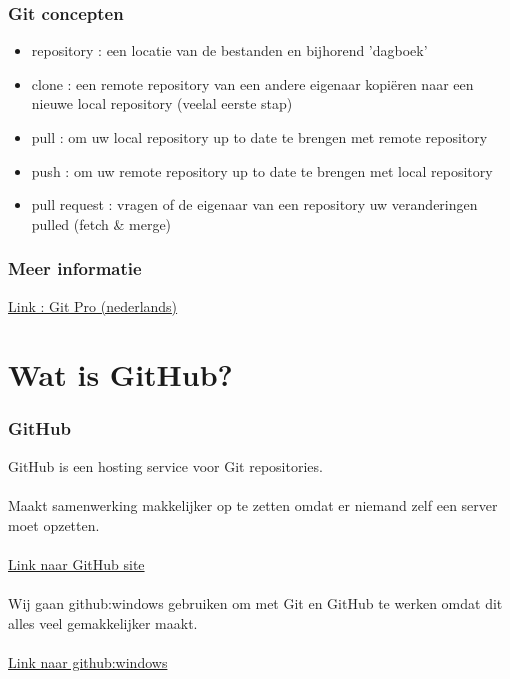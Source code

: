\documentclass{beamer}
\begin{document}
\begin{frame}

\frametitle{Git concepten}

{\Large \begin{itemize}
\item repository : een locatie van de bestanden en bijhorend 'dagboek'
\item clone : een remote repository van een andere eigenaar kopi\"eren naar een nieuwe local repository (veelal eerste stap)
\item pull : om uw local repository up to date te brengen met remote repository
\item push : om uw remote repository up to date te brengen met local repository
\item pull request : vragen of de eigenaar van een repository uw veranderingen pulled (fetch \& merge)
\end{itemize}}

\end{frame}


\begin{frame}

\frametitle{Meer informatie}

{\huge \href{http://git-scm.com/book/nl}{Link : Git Pro (nederlands)}}

\end{frame}


\section{Wat is GitHub?}


\begin{frame}

\frametitle{GitHub}

{\Large GitHub is een hosting service voor Git repositories.\\~\\

Maakt samenwerking makkelijker op te zetten omdat er niemand
zelf een server moet opzetten.\\~\\

\href{https://github.com/}{Link naar GitHub site}\\~\\

Wij gaan github:windows gebruiken om met Git en GitHub te werken omdat dit
alles veel gemakkelijker maakt.\\~\\

\href{http://windows.github.com/}{Link naar github:windows} }

\end{frame}
\end{document}
